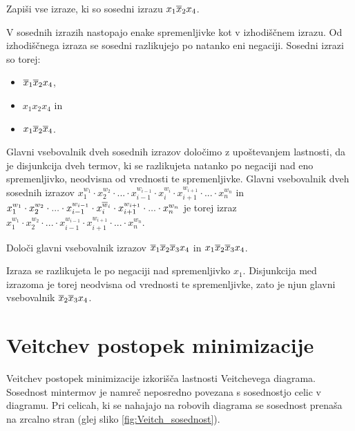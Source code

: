 \begin{zgled}
Zapiši vse izraze, ki so sosedni izrazu $x_1 \overline x_2 x_4$.\\
\end{zgled}
\begin{resitev}
V sosednih izrazih nastopajo enake spremenljivke kot v izhodiščnem izrazu. Od izhodiščnega izraza se sosedni razlikujejo po natanko eni negaciji. Sosedni izrazi so torej:
\begin{itemize}
\item $\overline x_1 \overline x_2 x_4$,
\item $x_1 x_2 x_4$ in
\item $x_1 \overline x_2 \overline x_4$.
\end{itemize}

\end{resitev}

Glavni vsebovalnik dveh sosednih izrazov določimo z upoštevanjem lastnosti, da je disjunkcija dveh termov, ki se razlikujeta natanko po negaciji nad eno spremenljivko, neodvisna od vrednosti te spremenljivke. Glavni vsebovalnik dveh sosednih izrazov $x_{1}^{w_1} \cdot x_{2}^{w_2} \cdot ... \cdot x_{i-1}^{w_{i-1}} \cdot x_{i}^{w_i} \cdot x_{i+1}^{w_{i+1}} \cdot ... \cdot x_{n}^{w_n}$ in $x_{1}^{w_1} \cdot x_{2}^{w_2} \cdot ... \cdot x_{i-1}^{w_{i-1}} \cdot x_{i}^{\overline w_i} \cdot x_{i+1}^{w_{i+1}} \cdot ... \cdot x_{n}^{w_n}$ je torej izraz $x_{1}^{w_1} \cdot x_{2}^{w_2} \cdot ... \cdot x_{i-1}^{w_{i-1}} \cdot x_{i+1}^{w_{i+1}} \cdot ... \cdot x_{n}^{w_n}$. 

\begin{zgled}
Določi glavni vsebovalnik izrazov $\overline x_1 \overline x_2 \overline x_3 x_4$ in $x_1 \overline x_2 \overline x_3 x_4$.\\
\end{zgled}
\begin{resitev}
Izraza se razlikujeta le po negaciji nad spremenljivko $x_1$. Disjunkcija med izrazoma je torej neodvisna od vrednosti te spremenljivke, zato je njun glavni vsebovalnik $\overline x_2 \overline x_3 x_4$.

\end{resitev}



\section{Veitchev postopek minimizacije}
Veitchev postopek minimizacije izkorišča lastnosti Veitchevega diagrama. Sosednost mintermov je namreč neposredno povezana s sosednostjo celic v diagramu. Pri celicah, ki se nahajajo na robovih diagrama se sosednost prenaša na zrcalno stran (glej sliko \ref{fig:Veitch_sosednost}).

